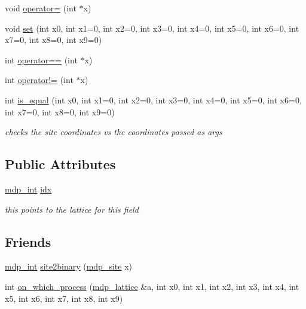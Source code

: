 \begin{DoxyCompactItemize}
void \hyperlink{classmdp__site_a8cf72becd9e8d125b31a5a40862bfa5a}{operator=} (int $\ast$x)
\item 
void \hyperlink{classmdp__site_a241eb259576cbe7354d1ff714d22416c}{set} (int x0, int x1=0, int x2=0, int x3=0, int x4=0, int x5=0, int x6=0, int x7=0, int x8=0, int x9=0)
\item 
int \hyperlink{classmdp__site_af311165eb929fe7cf2957742009590b9}{operator==} (int $\ast$x)
\item 
int \hyperlink{classmdp__site_a424ed9f2670e12a0a3fe521070fc5d41}{operator!=} (int $\ast$x)
\item 
int \hyperlink{classmdp__site_a0bf9ef3d304245c68e00d7b66886f020}{is\_\-equal} (int x0, int x1=0, int x2=0, int x3=0, int x4=0, int x5=0, int x6=0, int x7=0, int x8=0, int x9=0)
\begin{DoxyCompactList}\small\item\em checks the site coordinates vs the coordinates passed as args \item\end{DoxyCompactList}\end{DoxyCompactItemize}
\subsection*{Public Attributes}
\begin{DoxyCompactItemize}
\item 
\hyperlink{mdp__global__vars_8h_aaa1ad9d0dcd2124aa5af0120d9954174}{mdp\_\-int} \hyperlink{classmdp__site_a28354e929a397ee9b0030abe2583b29b}{idx}
\begin{DoxyCompactList}\small\item\em this points to the lattice for this field \item\end{DoxyCompactList}\end{DoxyCompactItemize}
\subsection*{Friends}
\begin{DoxyCompactItemize}
\item 
\hyperlink{mdp__global__vars_8h_aaa1ad9d0dcd2124aa5af0120d9954174}{mdp\_\-int} \hyperlink{classmdp__site_a03c9871dd1382a293be5394fafda9718}{site2binary} (\hyperlink{classmdp__site}{mdp\_\-site} x)
\item 
int \hyperlink{classmdp__site_ac96405ecdb78dc33d55edea04876a931}{on\_\-which\_\-process} (\hyperlink{classmdp__lattice}{mdp\_\-lattice} \&a, int x0, int x1, int x2, int x3, int x4, int x5, int x6, int x7, int x8, int x9)
\end{DoxyCompactItemize}


